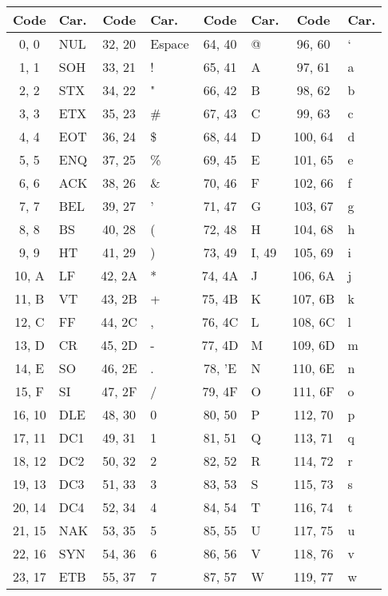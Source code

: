 \documentclass[12pt]{article}
\begin{document}
	\begin{center}
			\begin{tabular}{|c|l||c|l||c|l||c|l|}
			\hline
			Code & Car. & Code & Car. & Code & Car. & Code & Car.  \\
			\hline
			0, 0 & NUL & 32, 20 & Espace & 64, 40 & @ & 96, 60 & ` \\
			1, 1 & SOH & 33, 21 & ! & 65, 41 & A & 97, 61 & a \\
			2, 2 & STX & 34, 22 & " & 66, 42 & B & 98, 62 & b \\
			3, 3 & ETX & 35, 23 & \# & 67, 43 & C & 99, 63 & c \\
			4, 4 & EOT & 36, 24 & \$ & 68, 44 & D & 100, 64 & d \\
			5, 5 & ENQ & 37, 25 & \% & 69, 45 & E & 101, 65 & e \\
			6, 6 & ACK & 38, 26 & \& & 70, 46 & F & 102, 66 & f \\
			7, 7 & BEL & 39, 27 & ' & 71, 47 & G & 103, 67 & g \\
			8, 8 & BS & 40, 28 & ( & 72, 48 & H & 104, 68 & h \\
			9, 9 & HT & 41, 29 & ) & 73, 49 & I, 49 & 105, 69 & i \\
			10, A & LF & 42, 2A & * & 74, 4A & J & 106, 6A & j \\
			11, B & VT & 43, 2B & + & 75, 4B & K & 107, 6B & k \\
			12, C & FF & 44, 2C & , & 76, 4C & L & 108, 6C & l \\
			13, D & CR & 45, 2D & - & 77, 4D & M & 109, 6D & m \\
			14, E & SO & 46, 2E & . & 78, 'E & N & 110, 6E & n \\
			15, F & SI & 47, 2F & / & 79, 4F & O & 111, 6F & o \\
			16, 10 & DLE & 48, 30 & 0 & 80, 50 & P & 112, 70 & p \\
			17, 11 & DC1 & 49, 31 & 1 & 81, 51 & Q & 113, 71 & q \\
			18, 12 & DC2 & 50, 32 & 2 & 82, 52 & R & 114, 72 & r \\
			19, 13 & DC3 & 51, 33 & 3 & 83, 53 & S & 115, 73 & s \\
			20, 14 & DC4 & 52, 34 & 4 & 84, 54 & T & 116, 74 & t \\
			21, 15 & NAK & 53, 35 & 5 & 85, 55 & U & 117, 75 & u \\
			22, 16 & SYN & 54, 36 & 6 & 86, 56 & V & 118, 76 & v \\
			23, 17 & ETB & 55, 37 & 7 & 87, 57 & W & 119, 77 & w \\

\end{tabular}
\end{center}
\end{document}
